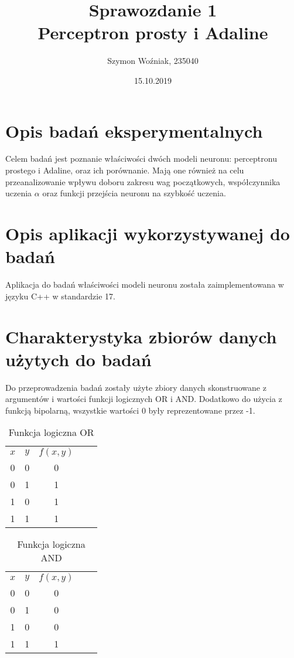 \documentclass{article}
\author{Szymon Woźniak, 235040}
\date{15.10.2019}
\title{Sprawozdanie 1\\Perceptron prosty i Adaline}
\begin{document}
	\maketitle
	\newpage
	
	\section{Opis badań eksperymentalnych}
	Celem badań jest poznanie właściwości dwóch modeli neuronu: perceptronu prostego i Adaline,
	oraz ich porównanie. Mają one również na celu przeanalizowanie wpływu doboru zakresu wag początkowych, współczynnika uczenia $\alpha$ oraz funkcji przejścia neuronu na szybkość uczenia.
	\section{Opis aplikacji wykorzystywanej do badań}
	Aplikacja do badań właściwości modeli neuronu została zaimplementowana w języku C++ w standardzie 17.
	\section{Charakterystyka zbiorów danych użytych do badań}
		Do przeprowadzenia badań zostały użyte zbiory danych
		skonstruowane z argumentów i wartości funkcji logicznych OR i AND.
		Dodatkowo do użycia z funkcją bipolarną, wszystkie wartości 0 były reprezentowane przez -1.
		\begin{table}[H]
			\centering
			\caption{Funkcja logiczna OR}
			\label{tab:or-func}
			\begin{tabular}{|c|c|c|ll}
			\cline{1-3}
			$x$ & $y$ & $f(x, y)$ &  &  \\ \cline{1-3}
			0 & 0 & 0       &  &  \\ \cline{1-3}
			0 & 1 & 1       &  &  \\ \cline{1-3}
			1 & 0 & 1       &  &  \\ \cline{1-3}
			1 & 1 & 1       &  &  \\ \cline{1-3}
			\end{tabular}
			\end{table}
		\begin{table}[H]
			\centering
			\caption{Funkcja logiczna AND}
			\label{tab:and-func}
			\begin{tabular}{|c|c|c|ll}
			\cline{1-3}
			$x$ & $y$ & $f(x, y)$ &  &  \\ \cline{1-3}
			0 & 0 & 0       &  &  \\ \cline{1-3}
			0 & 1 & 0       &  &  \\ \cline{1-3}
			1 & 0 & 0       &  &  \\ \cline{1-3}
			1 & 1 & 1       &  &  \\ \cline{1-3}
			\end{tabular}
			\end{table}
\end{document}
